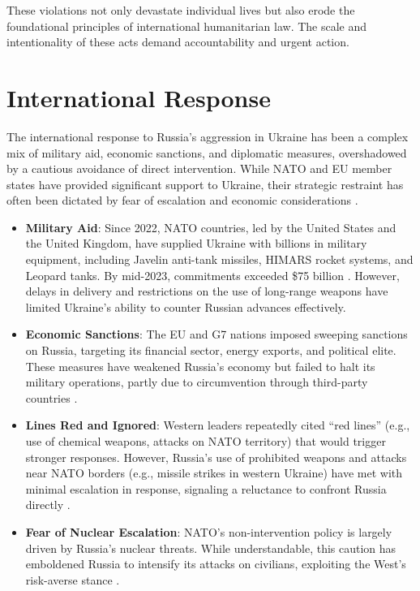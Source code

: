 \documentclass[a4paper,12pt]{article}
\begin{document}
These violations not only devastate individual lives but also erode the foundational principles of international humanitarian law. The scale and intentionality of these acts demand accountability and urgent action.

\section{International Response}
The international response to Russia’s aggression in Ukraine has been a complex mix of military aid, economic sanctions, and diplomatic measures, overshadowed by a cautious avoidance of direct intervention. While NATO and EU member states have provided significant support to Ukraine, their strategic restraint has often been dictated by fear of escalation and economic considerations \cite{osce_2023}.

\begin{itemize}
    \item \textbf{Military Aid}: Since 2022, NATO countries, led by the United States and the United Kingdom, have supplied Ukraine with billions in military equipment, including Javelin anti-tank missiles, HIMARS rocket systems, and Leopard tanks. By mid-2023, commitments exceeded \$75 billion \cite{un_2023}. However, delays in delivery and restrictions on the use of long-range weapons have limited Ukraine’s ability to counter Russian advances effectively.
    \item \textbf{Economic Sanctions}: The EU and G7 nations imposed sweeping sanctions on Russia, targeting its financial sector, energy exports, and political elite. These measures have weakened Russia’s economy but failed to halt its military operations, partly due to circumvention through third-party countries \cite{osce_2023}.
    \item \textbf{Lines Red and Ignored}: Western leaders repeatedly cited “red lines” (e.g., use of chemical weapons, attacks on NATO territory) that would trigger stronger responses. However, Russia’s use of prohibited weapons and attacks near NATO borders (e.g., missile strikes in western Ukraine) have met with minimal escalation in response, signaling a reluctance to confront Russia directly \cite{un_inquiry_2023}.
    \item \textbf{Fear of Nuclear Escalation}: NATO’s non-intervention policy is largely driven by Russia’s nuclear threats. While understandable, this caution has emboldened Russia to intensify its attacks on civilians, exploiting the West’s risk-averse stance \cite{hrw_2023}.
\end{itemize}
\end{document}
